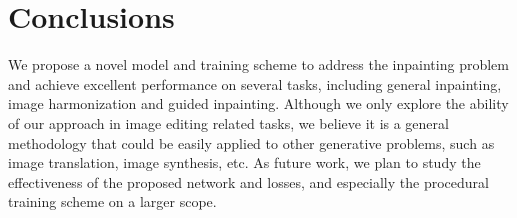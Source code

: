 \section{Conclusions}
We propose a novel model and training scheme to address the inpainting problem and achieve excellent performance on several tasks, including general inpainting, image harmonization and guided inpainting. Although we only explore the ability of our approach in image editing related tasks, we believe it is a general methodology that could be easily applied to other generative problems, such as image translation, image synthesis, etc. As future work, we plan to study the effectiveness of the proposed network and losses, and especially the procedural training scheme on a larger scope.
\label{sec:results}